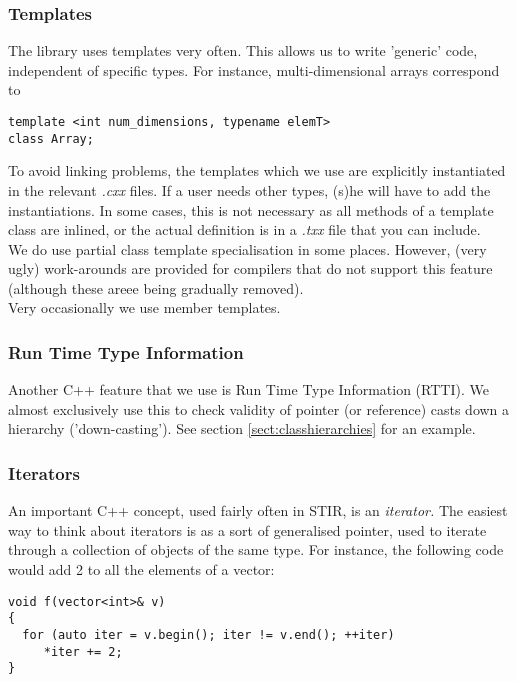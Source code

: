 \documentclass{article}
\begin{document}
\subsubsection{Templates}
The library uses templates very often. This allows us to write 
'generic' code, independent of specific types. For instance, 
multi-dimensional arrays correspond to 

\begin{verbatim}
template <int num_dimensions, typename elemT>
class Array;
\end{verbatim}


To avoid linking problems, the templates which we use are explicitly 
instantiated in the relevant \textit{.cxx} files. If a user needs 
other types, (s)he will have to add the instantiations. In some cases,
this is not necessary as all methods of a template class are inlined, or the
actual definition is in a \textit{.txx} file that you can include.\\
We do use partial class template specialisation in some places. 
However, (very ugly) work-arounds are provided for compilers 
that do not support this feature (although these areee being gradually removed).\\
Very occasionally we use member templates. 

\subsubsection{Run Time Type Information}
Another C++ feature that we use is Run Time Type 
Information (RTTI). We almost exclusively use this to check validity 
of pointer (or reference) casts down a hierarchy ('down-casting'). 
See section \ref{sect:classhierarchies} 
for an example.

\subsubsection{
Iterators}

An important C++ concept, used fairly often in STIR, is an \textit{iterator.} The 
easiest way to think about iterators is as a sort of generalised 
pointer, used to iterate through a collection of objects of the 
same type. For instance, the following code would add 2 to all 
the elements of a vector:

\begin{verbatim}
void f(vector<int>& v)
{
  for (auto iter = v.begin(); iter != v.end(); ++iter)
     *iter += 2;
}
\end{verbatim}
\end{document}
